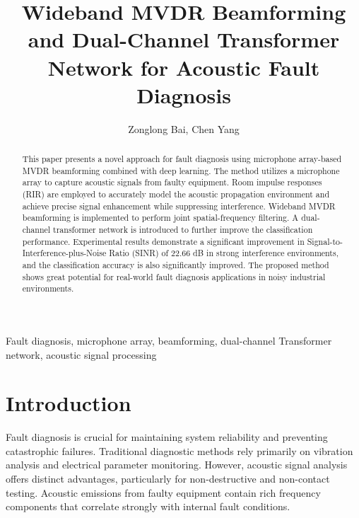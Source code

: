 \documentclass[journal]{IEEEtran}
\begin{document}
	\title{Wideband MVDR Beamforming and Dual-Channel Transformer Network for Acoustic Fault Diagnosis}
    
	\author{Zonglong Bai, Chen Yang}

	\maketitle
	\begin{abstract}
		This paper presents a novel approach for fault diagnosis using microphone array-based MVDR beamforming combined with deep learning. The method utilizes a microphone array to capture acoustic signals from faulty equipment. Room impulse responses (RIR) are employed to accurately model the acoustic propagation environment and achieve precise signal enhancement while suppressing interference. Wideband MVDR beamforming is implemented to perform joint spatial-frequency filtering. A dual-channel transformer network is introduced to further improve the classification performance. Experimental results demonstrate a significant improvement in Signal-to-Interference-plus-Noise Ratio (SINR) of 22.66 dB in strong interference environments, and the classification accuracy is also significantly improved. The proposed method shows great potential for real-world fault diagnosis applications in noisy industrial environments.
	\end{abstract}
	
	\begin{IEEEkeywords}
		Fault diagnosis, microphone array, beamforming, dual-channel Transformer network, acoustic signal processing
	\end{IEEEkeywords}

\section{Introduction}
Fault diagnosis is crucial for maintaining system reliability and preventing catastrophic failures. Traditional diagnostic methods rely primarily on vibration analysis and electrical parameter monitoring. However, acoustic signal analysis offers distinct advantages, particularly for non-destructive and non-contact testing. Acoustic emissions from faulty equipment contain rich frequency components that correlate strongly with internal fault conditions.
\end{document}
